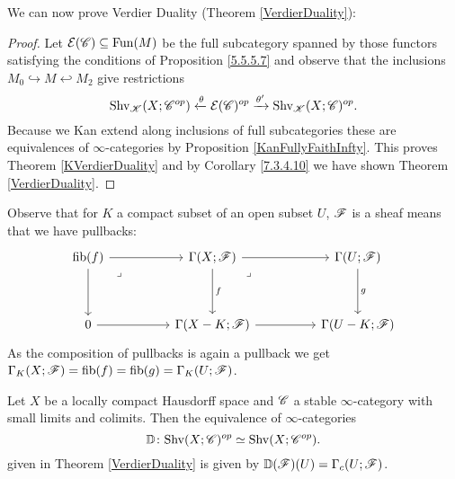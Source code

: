 \documentclass[../../thesis.tex]{subfiles}
\begin{document}
We can now prove Verdier Duality (Theorem \ref{VerdierDuality}):
\begin{proof}
    Let $\mathcal{E}(\mathscr{C}) \subseteq \mathrm{Fun}(M)$ be the full subcategory spanned by those functors satisfying the conditions of Proposition \ref{5.5.5.7} and observe that the inclusions $M_0 \hookrightarrow M \hookleftarrow M_2$ give restrictions
    \[
        \mathrm{Shv}_{\mathscr{K}}(X;\mathscr{C}^{op}) \xleftarrow{\theta} \mathcal{E}(\mathscr{C})^{op} \xrightarrow{\theta'} \mathrm{Shv}_{\mathscr{K}}(X;\mathscr{C})^{op}.
    \]
    Because we Kan extend along inclusions of full subcategories these are equivalences of $\infty$-categories by Proposition \ref{KanFullyFaithInfty}.
    This proves Theorem \ref{KVerdierDuality} and by Corollary \ref{7.3.4.10} we have shown Theorem \ref{VerdierDuality}.
\end{proof}
\begin{remark}\label{GammaKXisGammaKU}
    Observe that for $K$ a compact subset of an open subset $U$, $\mathscr{F}$ is a sheaf means that we have pullbacks:
    \[\begin{tikzcd}
            {\fib(f)} && {\Gamma(X;\F)} && {\Gamma(U;\F)} \\
            \\
            0 && {\Gamma(X-K;\F)} && {\Gamma(U-K;\F)}
            \arrow[from=1-3, to=1-5]
            \arrow["f", from=1-3, to=3-3]
            \arrow[from=3-3, to=3-5]
            \arrow["g", from=1-5, to=3-5]
            \arrow["\lrcorner"{anchor=center, pos=0.125}, draw=none, from=1-3, to=3-5]
            \arrow[from=1-1, to=3-1]
            \arrow[from=3-1, to=3-3]
            \arrow[from=1-1, to=1-3]
            \arrow["\lrcorner"{anchor=center, pos=0.125}, draw=none, from=1-1, to=3-3]
        \end{tikzcd}\]
    As the composition of pullbacks is again a pullback we get $\Gamma_K(X;\mathscr{F})=\operatorname{fib}(f)=\operatorname{fib}(g)=\Gamma_K(U;\mathscr{F})$.
\end{remark}
\begin{proposition}[{\cite[Proposition 5.5.5.10]{HA}}]
    Let $X$ be a locally compact Hausdorff space and $\mathscr{C}$ a stable $\infty$-category with small limits and colimits.
    Then the equivalence of $\infty$-categories
    \[
        \mathbb{D} \colon \mathrm{Shv}(X;\mathscr{C})^{op} \simeq \mathrm{Shv}(X;\mathscr{C}^{op}).
    \]
    given in Theorem \ref{VerdierDuality} is given by $\mathbb{D}(\mathscr{F})(U) = \Gamma_c(U;\mathscr{F})$.
\end{proposition}
\end{document}
